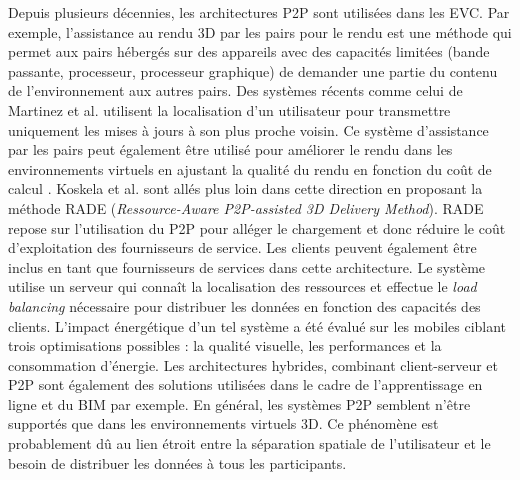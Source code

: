 Depuis plusieurs décennies, les architectures \gls{P2P} sont utilisées dans les 
\gls{EVC}. Par exemple, l'assistance au rendu \gls{3D} par les pairs pour le rendu 
est une 
méthode qui permet aux pairs hébergés sur des appareils avec des capacités 
limitées (bande passante, processeur, processeur graphique) de demander une 
partie du contenu de l'environnement aux autres pairs.
Des systèmes récents comme celui de Martinez et al. \cite{Martinez2009} 
utilisent la 
localisation d'un utilisateur pour transmettre uniquement les mises à jours à son 
plus 
proche voisin. 
Ce système d'assistance par les pairs peut également être utilisé pour améliorer le 
rendu dans les environnements virtuels en ajustant la qualité du rendu en fonction 
du coût de calcul \cite{Zhu2011}.  
Koskela et al. \cite{Koskela2014} sont allés plus loin dans cette direction en 
proposant la méthode RADE (\textit{Ressource-Aware P2P-assisted 3D Delivery 
	Method}). RADE repose sur l'utilisation du \gls{P2P} pour alléger le chargement 
	et 
donc réduire le coût d'exploitation des fournisseurs de service. Les 
clients peuvent également être inclus en tant que fournisseurs de services dans 
cette architecture. 
Le système utilise un serveur qui connaît la localisation des ressources et 
effectue le \textit{load balancing} nécessaire pour distribuer les données en 
fonction des capacités des clients. L'impact énergétique d'un tel système a été 
évalué sur les mobiles ciblant trois optimisations possibles : la qualité visuelle, les 
performances et la consommation d'énergie. 
Les architectures hybrides, combinant client-serveur et \gls{P2P} sont également 
des solutions utilisées dans le cadre de l'apprentissage en ligne 
\cite{Ekadiyanto2012} et du BIM \cite{Chen2014} par exemple. 
En général, les systèmes \gls{P2P} semblent n'être supportés que dans les 
environnements virtuels \gls{3D}. Ce phénomène est probablement dû au lien étroit 
entre la séparation spatiale de l'utilisateur et le besoin de distribuer les données à 
tous les participants.
%
%

